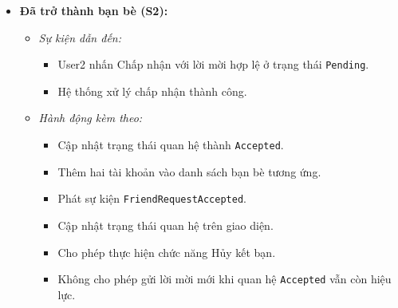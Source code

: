 \documentclass[11pt,a4paper]{article}
\begin{document}
\begin{itemize}[leftmargin=1.2cm, noitemsep]
    \item[\textbf{--}] \textbf{Đã trở thành bạn bè (S2):}
    \begin{itemize}[leftmargin=0.8cm, label=--, noitemsep]
        \item \textit{Sự kiện dẫn đến:}
        \begin{itemize}[leftmargin=0.6cm, label=$\ast$, noitemsep]
            \item User2 nhấn Chấp nhận với lời mời hợp lệ ở trạng thái \texttt{Pending}.
            \item Hệ thống xử lý chấp nhận thành công.
        \end{itemize}
        \item \textit{Hành động kèm theo:}
        \begin{itemize}[leftmargin=0.6cm, label=$\ast$, noitemsep]
            \item Cập nhật trạng thái quan hệ thành \texttt{Accepted}.
            \item Thêm hai tài khoản vào danh sách bạn bè tương ứng.
            \item Phát sự kiện \texttt{FriendRequestAccepted}.
            \item Cập nhật trạng thái quan hệ trên giao diện.
            \item Cho phép thực hiện chức năng Hủy kết bạn.
            \item Không cho phép gửi lời mời mới khi quan hệ \texttt{Accepted} vẫn còn hiệu lực.
        \end{itemize}
    \end{itemize}


\end{itemize}
\end{document}
